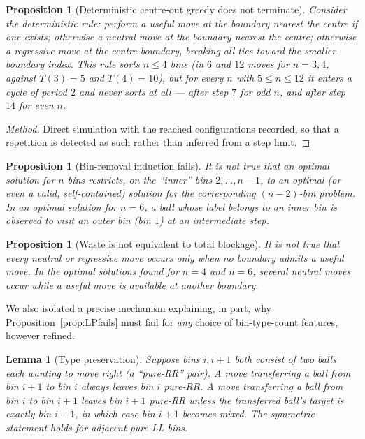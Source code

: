 \documentclass[11pt]{amsart}
\theoremstyle{plain}
\newtheorem{lemma}[theorem]{Lemma}
\newtheorem{proposition}[theorem]{Proposition}
\theoremstyle{definition}
\theoremstyle{remark}
\begin{document}
\begin{proposition}[Deterministic centre-out greedy does not terminate]
\label{prop:greedycycles}
Consider the deterministic rule: perform a useful move at the boundary nearest the centre if one exists; otherwise a neutral move at the boundary nearest the centre; otherwise a regressive move at the centre boundary, breaking all ties toward the smaller boundary index. This rule sorts $n\le 4$ bins (in $6$ and $12$ moves for $n=3,4$, against $T(3)=5$ and $T(4)=10$), but for every $n$ with $5\le n\le 12$ it enters a cycle of period $2$ and never sorts at all --- after step $7$ for odd $n$, and after step $14$ for even $n$.
\end{proposition}

\begin{proof}[Method]
Direct simulation with the reached configurations recorded, so that a repetition is detected as such rather than inferred from a step limit.
\end{proof}

\begin{proposition}[Bin-removal induction fails]
\label{prop:removalfails}
It is not true that an optimal solution for $n$ bins restricts, on the ``inner'' bins $2,\dots,n-1$, to an optimal (or even a valid, self-contained) solution for the corresponding $(n-2)$-bin problem. In an optimal solution for $n=6$, a ball whose label belongs to an inner bin is observed to visit an outer bin (bin $1$) at an intermediate step.
\end{proposition}

\begin{proposition}[Waste is not equivalent to total blockage]
\label{prop:blockagefails}
It is not true that every neutral or regressive move occurs only when \emph{no} boundary admits a useful move. In the optimal solutions found for $n=4$ and $n=6$, several neutral moves occur while a useful move is available at another boundary.
\end{proposition}

We also isolated a precise mechanism explaining, in part, why Proposition~\ref{prop:LPfails} must fail for \emph{any} choice of bin-type-count features, however refined.

\begin{lemma}[Type preservation]
\label{lem:typepreservation}
Suppose bins $i,i+1$ both consist of two balls each wanting to move right (a ``pure-RR'' pair). A move transferring a ball from bin $i+1$ to bin $i$ always leaves bin $i$ pure-RR. A move transferring a ball from bin $i$ to bin $i+1$ leaves bin $i+1$ pure-RR unless the transferred ball's target is exactly bin $i+1$, in which case bin $i+1$ becomes mixed. The symmetric statement holds for adjacent pure-LL bins.
\end{lemma}
\end{document}
